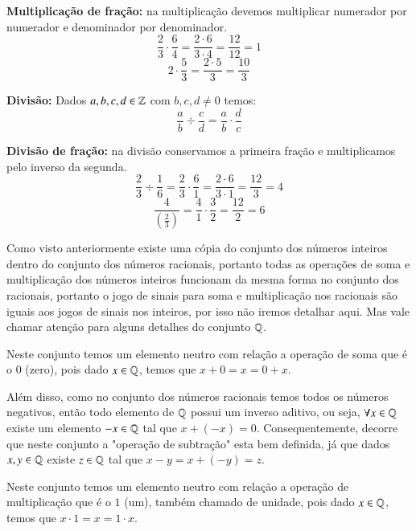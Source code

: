  \vskip0.3cm
 \begin{exem}
  \textbf{Multiplicação de fração:} na multiplicação devemos multiplicar numerador por numerador e denominador por denominador.
   \[\frac{2}{3} \cdot \frac{6}{4}= \frac{2 \cdot 6}{3 \cdot 4}= \frac{12}{12}= 1 \]
   \[2 \cdot \frac{5}{3}= \frac{2 \cdot 5}{3}= \frac{10}{3}\]
 \end{exem}

 \vskip0.3cm

 \colorbox{azul}{
 \begin{minipage}{0.9\linewidth}
 \begin{center}
  \textbf{Divisão:} Dados $a, b, c, d \in \mathbb{Z}$ com $b, c, d \neq 0$ temos:
 \[\frac{a}{b} \div \frac{c}{d}= \frac{a}{b} \cdot \frac{d}{c} \]
 \end{center}
 \end{minipage}}

 \vskip0.3cm
 \begin{exem}
  \textbf{Divisão de fração:} na divisão conservamos a primeira fração e multiplicamos pelo inverso da segunda.
   \[\frac{2}{3} \div \frac{1}{6}= \frac{2}{3} \cdot \frac{6}{1}= \frac{2 \cdot 6}{3 \cdot 1}= \frac{12}{3}= 4 \]
   \[\frac{4}{\left(\frac{2}{3}\right)}= \frac{4}{1} \cdot \frac{3}{2}= \frac{12}{2}=6\]
 \end{exem}

 Como visto anteriormente existe uma cópia do conjunto dos números inteiros dentro do conjunto dos números racionais, portanto todas as operações de soma e multiplicação dos números inteiros funcionam da mesma forma no conjunto dos racionais, portanto o jogo de sinais para soma e multiplicação nos racionais são iguais aos jogos de sinais nos inteiros, por isso não iremos detalhar aqui. Mas vale chamar atenção para alguns detalhes do conjunto $\mathbb{Q}$.
 
   Neste conjunto temos um elemento neutro com relação a operação de soma que é o $0$ (zero), pois dado $x \in \mathbb{Q}$, temos que $x+0= x= 0+x$.
 
 Além disso, como no conjunto dos números racionais temos todos os números negativos, então todo elemento de $\mathbb{Q}$ possui um inverso aditivo, ou seja, $\forall x \in \mathbb{Q}$ existe um elemento $-x \in \mathbb{Q}$ tal que $x + (-x)=0$. Consequentemente, decorre que neste conjunto a "operação de subtração" esta bem definida, já que dados $x, y \in \mathbb{Q}$ existe $z \in \mathbb{Q}$ tal que $x - y= x+ (-y)= z$.
 
 Neste conjunto temos um elemento neutro com relação a operação de multiplicação que é o $1$ (um), também chamado de unidade, pois dado $x \in \mathbb{Q}$, temos que $x \cdot 1= x= 1 \cdot x$.

